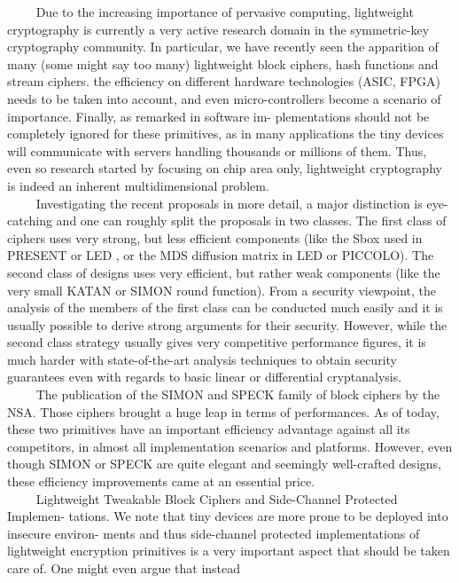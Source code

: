 \documentclass[preprint]{transcrypto}
\begin{document}
$\quad\quad$ Due to the increasing importance of pervasive computing, lightweight cryptography is
currently a very active research domain in the symmetric-key cryptography community.
In particular, we have recently seen the apparition of many (some might say too many)
lightweight block ciphers, hash functions and stream ciphers. the efficiency on different hardware technologies (ASIC, FPGA) needs to be taken into account, and even micro-controllers become a scenario of importance. Finally, as remarked in software im- plementations should not be completely ignored for these  primitives, as in many applications the tiny devices will communicate with servers handling thousands or millions of them. Thus, even so research started by focusing on chip area only, lightweight cryptography is indeed an inherent multidimensional problem.
\\ 
\tab $\quad\quad$ Investigating the recent proposals in more detail, a major distinction is eye-catching
and one can roughly split the proposals in two classes. The first class of ciphers uses very
strong, but less efficient components (like the Sbox used in PRESENT  or LED , or
the MDS diffusion matrix in LED or PICCOLO). The second class of designs uses very
efficient, but rather weak components (like the very small KATAN or SIMON  round function). From a security viewpoint, the analysis of the members of the first class can be conducted much easily and it is usually possible to derive strong arguments for their security. However, while the second class strategy usually gives very competitive performance figures, it is much harder with state-of-the-art analysis techniques to obtain security guarantees even with regards to basic linear or differential cryptanalysis.
\\
\tab $\quad\quad$ The  publication of the SIMON and SPECK family of block ciphers by the NSA. Those ciphers brought a huge leap in terms of performances. As of today, these two primitives have an important efficiency advantage against all its competitors, in almost all implementation scenarios and platforms. However, even though SIMON or SPECK are quite elegant and seemingly well-crafted designs, these efficiency improvements came at an essential price. 
\\
\tab $\quad\quad$ Lightweight Tweakable Block Ciphers and Side-Channel Protected Implemen-
tations. We note that tiny devices are more prone to be deployed into insecure environ-
ments and thus side-channel protected implementations of lightweight encryption primitives
is a very important aspect that should be taken care of. One might even argue that instead
\end{document}
